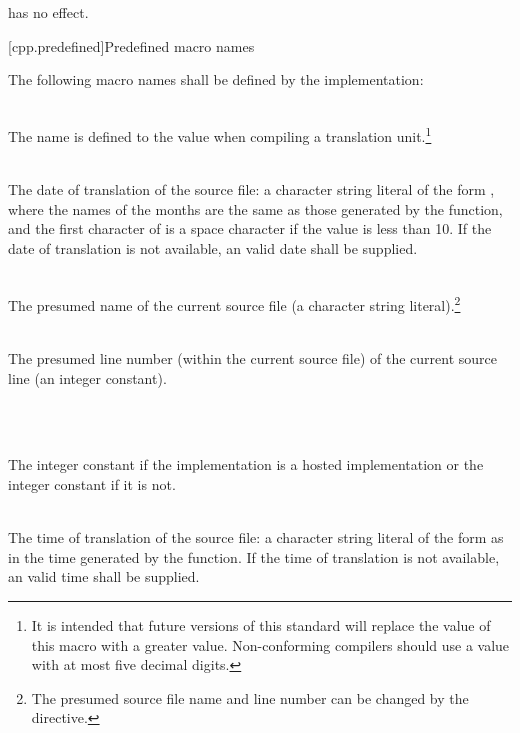 has no effect.

[cpp.predefined]{Predefined macro names}
%

\pnum
The following macro names shall be defined by the implementation:

\begin{description}

%
\item {}\\
The name  is defined
to the value
\tcode{\cppver}
when
compiling a \Cpp translation unit.\footnote{It is intended that future
versions of this standard will
replace the value of this macro with a greater value.
Non-conforming compilers should use a value with at most
five decimal digits.}

%
\item {}\\
The date of translation of the source file:
a character string literal of the form
,
where the names of the months are the same as those generated
by the
function,
and the first character of
is a space character if the value is less than 10.
If the date of translation is not available,
an  valid date
shall be supplied.

%
\item {}\\
The presumed name of the current source file (a character string
literal).\footnote{The presumed source file name and line number can be changed
by the  directive.}

%
\item {}\\
The presumed line number (within the current source file) of the current source line
(an integer constant).%
\addtocounter{footnote}{-1}\footnotemark\

%
%
\item {}\\
The integer constant  if the implementation is a hosted
implementation or the integer constant  if it is not.

%
\item {}\\
The time of translation of the source file:
a character string literal of the form
as in the time generated by the
function.
If the time of translation is not available,
an  valid time shall be supplied.
\end{description}

